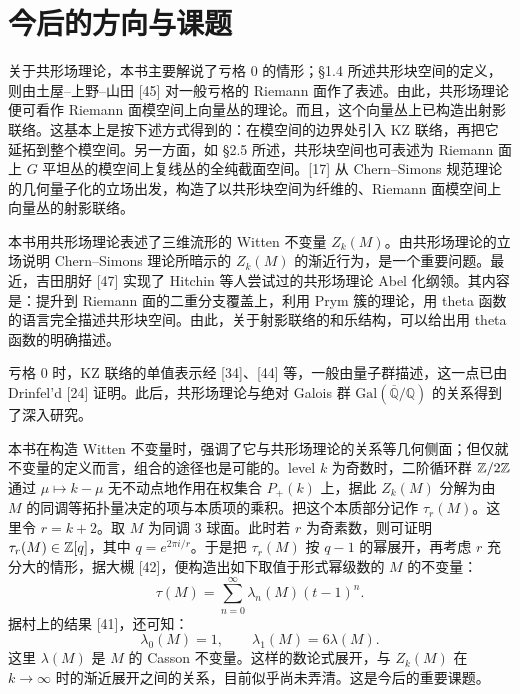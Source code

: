 
\chapter*{今后的方向与课题}


关于共形场理论，本书主要解说了亏格 $0$ 的情形；§1.4 所述共形块空间的定义，则由土屋--上野--山田 [45] 对一般亏格的 Riemann 面作了表述。由此，共形场理论便可看作 Riemann 面模空间上向量丛的理论。而且，这个向量丛上已构造出射影联络。这基本上是按下述方式得到的：在模空间的边界处引入 KZ 联络，再把它延拓到整个模空间。另一方面，如 §2.5 所述，共形块空间也可表述为 Riemann 面上 $G$ 平坦丛的模空间上复线丛的全纯截面空间。[17] 从 Chern--Simons 规范理论的几何量子化的立场出发，构造了以共形块空间为纤维的、Riemann 面模空间上向量丛的射影联络。

本书用共形场理论表述了三维流形的 Witten 不变量 $Z_k(M)$。由共形场理论的立场说明 Chern--Simons 理论所暗示的 $Z_k(M)$ 的渐近行为，是一个重要问题。最近，吉田朋好 [47] 实现了 Hitchin 等人尝试过的共形场理论 Abel 化纲领。其内容是：提升到 Riemann 面的二重分支覆盖上，利用 Prym 簇的理论，用 theta 函数的语言完全描述共形块空间。由此，关于射影联络的和乐结构，可以给出用 theta 函数的明确描述。

亏格 $0$ 时，KZ 联络的单值表示经 [34]、[44] 等，一般由量子群描述，这一点已由 Drinfel'd [24] 证明。此后，共形场理论与绝对 Galois 群 $\mathrm{Gal}(\overline{\mathbb{Q}}/\mathbb{Q})$ 的关系得到了深入研究。



本书在构造 Witten 不变量时，强调了它与共形场理论的关系等几何侧面；但仅就不变量的定义而言，组合的途径也是可能的。level $k$ 为奇数时，二阶循环群 $\mathbb{Z}/2\mathbb{Z}$ 通过 $\mu\mapsto k-\mu$ 无不动点地作用在权集合 $P_{+}(k)$ 上，据此 $Z_k(M)$ 分解为由 $M$ 的同调等拓扑量决定的项与本质项的乘积。把这个本质部分记作 $\tau_r(M)$。这里令 $r=k+2$。取 $M$ 为同调 3 球面。此时若 $r$ 为奇素数，则可证明 $\tau_r(M)\in\mathbb{Z}[q]$，其中 $q=e^{2\pi i/r}$。于是把 $\tau_r(M)$ 按 $q-1$ 的幂展开，再考虑 $r$ 充分大的情形，据大槻 [42]，便构造出如下取值于形式幂级数的 $M$ 的不变量：
\[
  \tau(M)=\sum_{n=0}^{\infty}\lambda_n(M)(t-1)^{n}.
\]
据村上的结果 [41]，还可知：
\[
  \lambda_0(M)=1,\qquad \lambda_1(M)=6\lambda(M).
\]
这里 $\lambda(M)$ 是 $M$ 的 Casson 不变量。这样的数论式展开，与 $Z_k(M)$ 在 $k\to\infty$ 时的渐近展开之间的关系，目前似乎尚未弄清。这是今后的重要课题。

